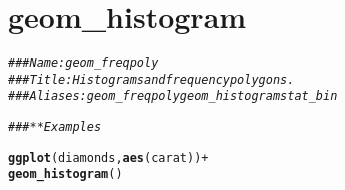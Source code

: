 \documentclass[a4paper,titlepage]{tufte-handout}\usepackage[]{graphicx}\usepackage[]{color}
\makeatletter
\newcommand{\hlcom}[1]{\textcolor[rgb]{0.678,0.584,0.686}{\textit{#1}}}%
\newcommand{\hlopt}[1]{\textcolor[rgb]{0,0,0}{#1}}%
\newcommand{\hlstd}[1]{\textcolor[rgb]{0.345,0.345,0.345}{#1}}%
\newcommand{\hlkwd}[1]{\textcolor[rgb]{0.737,0.353,0.396}{\textbf{#1}}}%
\newenvironment{kframe}{%
 \def\at@end@of@kframe{}%
 \ifinner\ifhmode%
  \def\at@end@of@kframe{\end{minipage}}%
  \begin{minipage}{\columnwidth}%
 \fi\fi%
 \def\FrameCommand##1{\hskip\@totalleftmargin \hskip-\fboxsep
 \colorbox{shadecolor}{##1}\hskip-\fboxsep
     \hskip-\linewidth \hskip-\@totalleftmargin \hskip\columnwidth}%
 \MakeFramed {\advance\hsize-\width
   \@totalleftmargin\z@ \linewidth\hsize
   \@setminipage}}%
 {\par\unskip\endMakeFramed%
 \at@end@of@kframe}
\newenvironment{knitrout}{}{} %
\makeatother
\begin{document}
\section{geom\_histogram}

\begin{knitrout}
\color{fgcolor}\begin{kframe}
\begin{alltt}
\hlcom{### Name: geom_freqpoly}
\hlcom{### Title: Histograms and frequency polygons.}
\hlcom{### Aliases: geom_freqpoly geom_histogram stat_bin}

\hlcom{### ** Examples}

\hlkwd{ggplot}\hlstd{(diamonds,} \hlkwd{aes}\hlstd{(carat))} \hlopt{+}
  \hlkwd{geom_histogram}\hlstd{()}
\end{alltt}



\end{kframe}
\end{knitrout}
\end{document}
